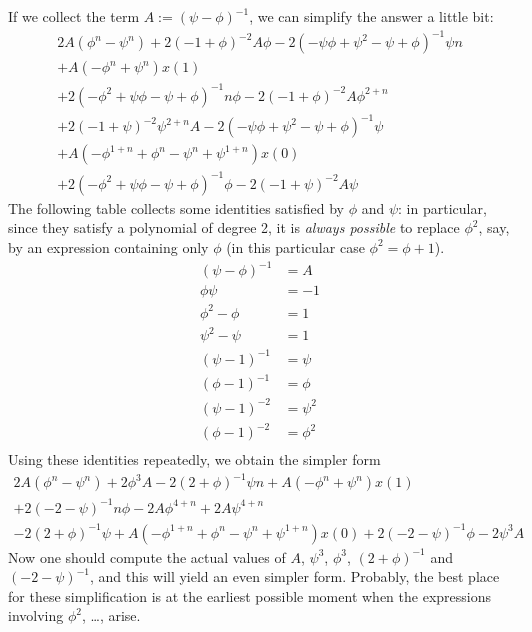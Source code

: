 \documentclass[a4paper]{article}
\begin{document}
\begin{enumerate}
If we collect the term $A := (\psi-\phi)^{-1}$, we can simplify the answer 
a little bit:
\begin{multline*}
  2 A (\phi^n - \psi^n) + 2 (-1+\phi)^{-2} A \phi
  -
  2 (-\psi \phi+\psi^2 - \psi+\phi)^{-1} \psi n \\
  +
  A (-\phi^n + \psi^n) x(1) \\
  +
  2 (-\phi^2+\psi \phi-\psi+\phi)^{-1} n \phi
  -
  2 (-1+\phi)^{-2} A \phi^{2+n} \\
  +
  2 (-1+\psi)^{-2} \psi^{2+n} A
  -
  2 (-\psi \phi+\psi^2-\psi+\phi)^{-1} \psi \\
  +
  A (- \phi^{1+n} + \phi^n - \psi^n + \psi^{1+n}) x(0) \\
  +
  2 (-\phi^2+\psi \phi-\psi+\phi)^{-1} \phi
  -
  2 (-1+\psi)^{-2} A \psi
\end{multline*}
The following table collects some identities satisfied by $\phi$ and
$\psi$: in particular, since they satisfy a polynomial of degree 2, it
is \emph{always possible} to replace $\phi^2$, say, by an expression
containing only $\phi$ (in this particular case $\phi^2 = \phi + 1$).
\begin{align*}
  (\psi-\phi)^{-1} &= A      \\
  \phi \psi        &= - 1    \\
  \phi^2 - \phi    &= 1      \\
  \psi^2 - \psi    &= 1      \\
  (\psi - 1)^{-1}  &= \psi   \\
  (\phi - 1)^{-1}  &= \phi   \\
  (\psi - 1)^{-2}  &= \psi^2 \\
  (\phi - 1)^{-2}  &= \phi^2 \\
\end{align*}
Using these identities repeatedly, we obtain the simpler form
\begin{multline*}
  2 A (\phi^n - \psi^n) + 2 \phi^3 A
  -
  2 (2 + \phi)^{-1} \psi n
  +
  A (-\phi^n + \psi^n) x(1) \\
  +
  2 (- 2 - \psi)^{-1} n \phi
  -
  2 A \phi^{4+n}
  +
  2 A \psi^{4+n} \\
  -
  2 (2 + \phi)^{-1} \psi
  +
  A (- \phi^{1+n} + \phi^n - \psi^n + \psi^{1+n}) x(0)
  +
  2 (- 2 - \psi)^{-1} \phi
  -
  2 \psi^3 A
\end{multline*}
Now one should compute the actual values of $A$, $\psi^3$, $\phi^3$,
$(2 + \phi)^{-1}$ and $(- 2 -\psi)^{-1}$, and this will yield an even
simpler form.
Probably, the best place for these simplification is at the earliest
possible moment when the expressions involving $\phi^2$, \dots, arise.


\end{enumerate}
\end{document}
